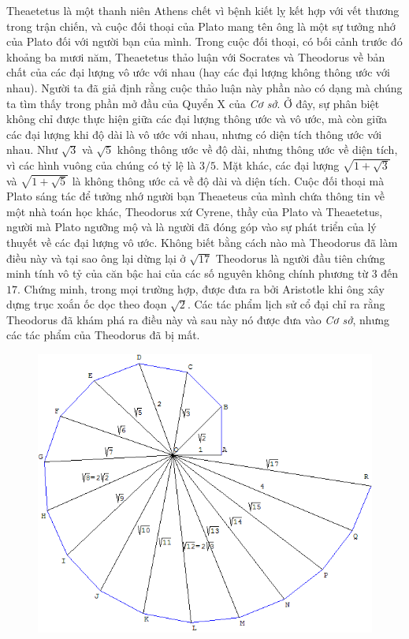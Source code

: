 \begin{multicols}{2}
	\vskip 0.1cm
	Theaetetus là một thanh niên Athens chết vì bệnh kiết lỵ kết hợp với vết thương trong trận chiến, và cuộc đối thoại của Plato mang tên ông là một sự tưởng nhớ của Plato đối với người bạn của mình.
	\vskip 0.1cm
	Trong cuộc đối thoại, có bối cảnh trước đó khoảng ba mươi năm, Theaetetus thảo luận với Socrates và Theodorus về bản chất của các đại lượng vô ước với nhau (hay các đại lượng không thông ước với nhau). Người ta đã giả định rằng cuộc thảo luận này phần nào có dạng mà chúng ta tìm thấy trong phần mở đầu của Quyển X của \textit{Cơ sở}.
	\vskip 0.1cm
	Ở đây, sự phân biệt không chỉ được thực hiện giữa các đại lượng thông ước và vô ước, mà còn giữa các đại lượng khi độ dài là vô ước với nhau, nhưng có diện tích thông ước với nhau. Như $\sqrt{3}$  và $\sqrt{5}$  không thông ước về độ dài, nhưng thông ước về diện tích, vì các hình vuông của chúng có tỷ lệ là $3/5$.
	\vskip 0.1cm
	Mặt khác, các đại lượng  $\sqrt{1 + \sqrt{3}}$  và $\sqrt{1 + \sqrt{5}}$ là không thông ước cả về độ dài và diện tích.
	\vskip 0.1cm
	Cuộc đối thoại mà Plato sáng tác để tưởng nhớ người bạn Theaeteus của mình chứa thông tin về một nhà toán học khác, Theodorus xứ Cyrene, thầy của Plato và Theaetetus, người mà Plato ngưỡng mộ và là người đã đóng góp vào sự phát triển của lý thuyết về các đại lượng vô ước. 
	\vskip 0.1cm
	Không biết bằng cách nào mà Theodorus đã làm điều này và tại sao ông lại dừng lại ở $\sqrt{17}$ 
	\vskip 0.1cm
	Theodorus là người đầu tiên chứng minh tính vô tỷ của căn bậc hai của các số nguyên không chính phương từ $3$ đến $17$.	 
	\vskip 0.1cm
	Chứng minh, trong mọi trường hợp, được đưa ra bởi Aristotle khi ông xây dựng trục xoắn ốc dọc theo đoạn $\sqrt{2}$. Các tác phẩm lịch sử cổ đại chỉ ra rằng Theodorus đã khám phá ra điều này và sau này nó được đưa vào \textit{Cơ sở}, nhưng các tác phẩm của Theodorus đã bị mất. 
	\begin{figure}[H]
		\vspace*{-5pt}
		\centering
		\captionsetup{labelformat= empty, justification=centering}
		\includegraphics[width= 0.85\linewidth]{H8}

\end{figure}
\end{multicols}
